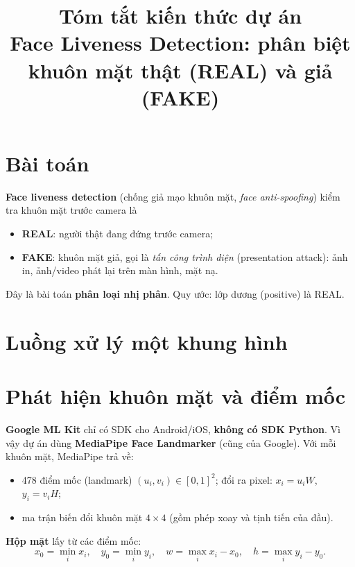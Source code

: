 \documentclass[12pt,a4paper]{article}
\title{Tóm tắt kiến thức dự án\\\large Face Liveness Detection: phân biệt khuôn mặt thật (REAL) và giả (FAKE)}
\author{}
\date{}
\begin{document}
\maketitle

\section{Bài toán}
\textbf{Face liveness detection} (chống giả mạo khuôn mặt, \emph{face anti-spoofing}) kiểm tra khuôn mặt trước camera là
\begin{itemize}
  \item \textbf{REAL}: người thật đang đứng trước camera;
  \item \textbf{FAKE}: khuôn mặt giả, gọi là \emph{tấn công trình diện} (presentation attack): ảnh in, ảnh/video phát lại trên màn hình, mặt nạ.
\end{itemize}
Đây là bài toán \textbf{phân loại nhị phân}. Quy ước: lớp dương (positive) là REAL.

\section{Luồng xử lý một khung hình}
\begin{center}
\end{center}

\section{Phát hiện khuôn mặt và điểm mốc}
\textbf{Google ML Kit} chỉ có SDK cho Android/iOS, \textbf{không có SDK Python}. Vì vậy dự án dùng \textbf{MediaPipe Face Landmarker} (cũng của Google). Với mỗi khuôn mặt, MediaPipe trả về:
\begin{itemize}
  \item 478 điểm mốc (landmark) $(u_i, v_i) \in [0,1]^2$; đổi ra pixel: $x_i = u_i W$, $y_i = v_i H$;
  \item ma trận biến đổi khuôn mặt $4\times4$ (gồm phép xoay và tịnh tiến của đầu).
\end{itemize}
\textbf{Hộp mặt} lấy từ các điểm mốc:
\[
x_0 = \min_i x_i,\quad y_0 = \min_i y_i,\quad w = \max_i x_i - x_0,\quad h = \max_i y_i - y_0 .
\]
\end{document}

